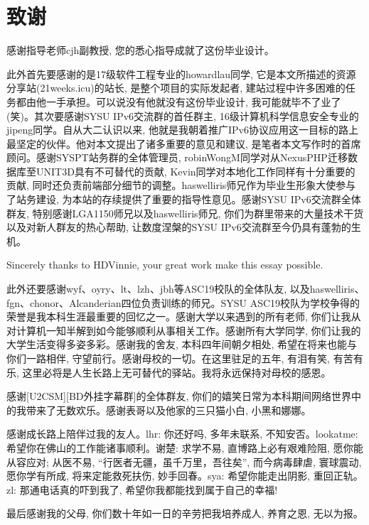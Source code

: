
\chapter{致谢}

感谢指导老师cjh副教授, 您的悉心指导成就了这份毕业设计。

此外首先要感谢的是17级软件工程专业的howardlau同学, 它是本文所描述的资源分享站(21weeks.icu)的站长, 是整个项目的实际发起者, 建站过程中许多困难的任务都由他一手承担。可以说没有他就没有这份毕业设计, 我可能就毕不了业了(笑)。其次要感谢SYSU IPv6交流群的首任群主, 16级计算机科学信息安全专业的jipeng同学。自从大二认识以来, 他就是我朝着推广IPv6协议应用这一目标的路上最坚定的伙伴。他对本文提出了诸多重要的意见和建议, 是笔者本文写作时的首席顾问。感谢SYSPT站务群的全体管理员, robinWongM同学对从NexusPHP迁移数据库至UNIT3D具有不可替代的贡献, Kevin同学对本地化工作同样有十分重要的贡献, 同时还负责前端部分细节的调整。haswelliris师兄作为毕业生形象大使参与了站务建设, 为本站的存续提供了重要的指导性意见。感谢SYSU IPv6交流群全体群友, 特别感谢LGA1150师兄以及haswelliris师兄, 你们为群里带来的大量技术干货以及对新人群友的热心帮助, 让数度涅槃的SYSU IPv6交流群至今仍具有蓬勃的生机。

Sincerely thanks to HDVinnie, your great work make this essay possible.

此外还要感谢wyf、oyry、lt、lzh、jbh等ASC19校队的全体队友, 以及haswelliris、fgn、chonor、Alcanderian四位负责训练的师兄。SYSU ASC19校队为学校争得的荣誉是我本科生涯最重要的回忆之一。感谢大学以来遇到的所有老师, 你们让我从对计算机一知半解到如今能够顺利从事相关工作。感谢所有大学同学, 你们让我的大学生活变得多姿多彩。感谢我的舍友, 本科四年间朝夕相处, 希望在将来也能与你们一路相伴, 守望前行。感谢母校的一切。在这里驻足的五年, 有泪有笑, 有苦有乐, 这里必将是人生长路上无可替代的驿站。我将永远保持对母校的感恩。

感谢[U2CSM][BD外挂字幕群]的全体群友, 你们的嬉笑日常为本科期间网络世界中的我带来了无数欢乐。感谢表哥以及他家的三只猫小白, 小黑和娜娜。

感谢成长路上陪伴过我的友人。lhr: 你还好吗, 多年未联系, 不知安否。lookatme: 希望你在佛山的工作能诸事顺利。谢楚: 求学不易, 直博路上必有艰难险阻, 愿你能从容应对; 从医不易, ``行医者无疆，虽千万里，吾往矣'', 而今病毒肆虐, 寰球震动, 愿你学有所成, 将来定能救死扶伤, 妙手回春。sya: 希望你能走出阴影, 重回正轨。zl: 那通电话真的吓到我了, 希望你我都能找到属于自己的幸福!

最后感谢我的父母, 你们数十年如一日的辛劳把我培养成人, 养育之恩, 无以为报。
